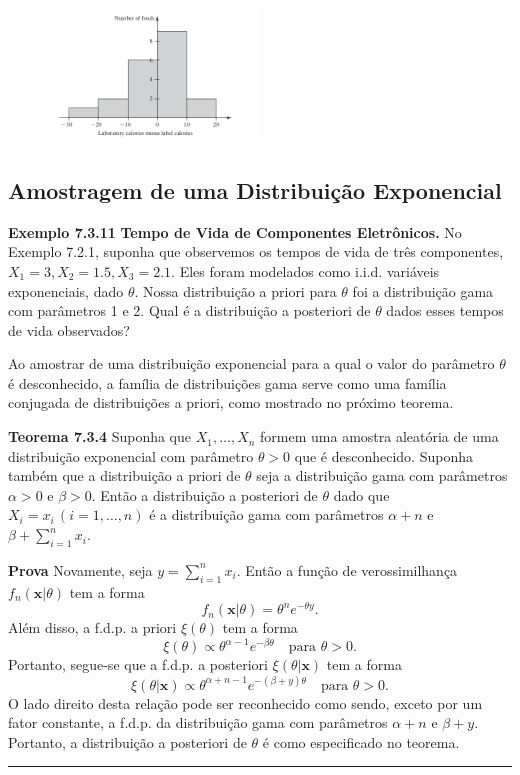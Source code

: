 \vspace{1cm}
\begin{figure}[H]

\centering

\includegraphics[width=0.5\textwidth]{img/7_3/img_2.png}

\end{figure}\vspace{1cm}

\subsection*{Amostragem de uma Distribuição Exponencial}

\noindent\textbf{Exemplo 7.3.11} \quad \textbf{Tempo de Vida de Componentes Eletrônicos.} No Exemplo 7.2.1, suponha que observemos os tempos de vida de três componentes, $X_1=3, X_2=1.5, X_3=2.1$. Eles foram modelados como i.i.d. variáveis exponenciais, dado $\theta$. Nossa distribuição a priori para $\theta$ foi a distribuição gama com parâmetros 1 e 2. Qual é a distribuição a posteriori de $\theta$ dados esses tempos de vida observados?

\vspace{1cm}
Ao amostrar de uma distribuição exponencial para a qual o valor do parâmetro $\theta$ é desconhecido, a família de distribuições gama serve como uma família conjugada de distribuições a priori, como mostrado no próximo teorema.

\vspace{1cm}
\noindent\textbf{Teorema 7.3.4} \quad Suponha que $X_1, \dots, X_n$ formem uma amostra aleatória de uma distribuição exponencial com parâmetro $\theta>0$ que é desconhecido. Suponha também que a distribuição a priori de $\theta$ seja a distribuição gama com parâmetros $\alpha>0$ e $\beta>0$. Então a distribuição a posteriori de $\theta$ dado que $X_i=x_i \, (i=1, \dots, n)$ é a distribuição gama com parâmetros $\alpha+n$ e $\beta+\sum_{i=1}^{n}x_i$.

\vspace{1cm}
\noindent\textbf{Prova} \quad Novamente, seja $y=\sum_{i=1}^{n}x_i$. Então a função de verossimilhança $f_n(\mathbf{x}|\theta)$ tem a forma
$$ f_n(\mathbf{x}|\theta) = \theta^n e^{-\theta y}. $$
Além disso, a f.d.p. a priori $\xi(\theta)$ tem a forma
$$ \xi(\theta) \propto \theta^{\alpha-1}e^{-\beta\theta} \quad \text{para } \theta>0. $$
Portanto, segue-se que a f.d.p. a posteriori $\xi(\theta|\mathbf{x})$ tem a forma
$$ \xi(\theta|\mathbf{x}) \propto \theta^{\alpha+n-1}e^{-(\beta+y)\theta} \quad \text{para } \theta>0. $$
O lado direito desta relação pode ser reconhecido como sendo, exceto por um fator constante, a f.d.p. da distribuição gama com parâmetros $\alpha+n$ e $\beta+y$. Portanto, a distribuição a posteriori de $\theta$ é como especificado no teorema. \rule{0.5em}{0.5em}

